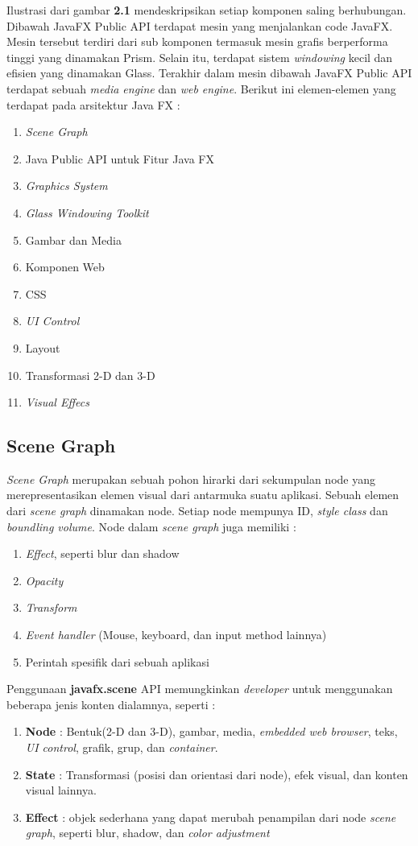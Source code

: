 Ilustrasi dari gambar \textbf{2.1} mendeskripsikan setiap komponen saling berhubungan. Dibawah JavaFX Public API terdapat mesin yang menjalankan code JavaFX. Mesin tersebut terdiri dari sub komponen termasuk mesin grafis berperforma tinggi yang dinamakan Prism. Selain itu, terdapat sistem \textit{windowing} kecil dan efisien yang dinamakan Glass. Terakhir dalam mesin dibawah JavaFX Public API terdapat sebuah \textit{media engine} dan \textit{web engine}. Berikut ini elemen-elemen yang terdapat pada arsitektur Java FX : \cite{javafx}
\begin{enumerate}
	\item \textit{Scene Graph}
	\item Java Public API untuk Fitur Java FX
	\item \textit{Graphics System}
	\item \textit{Glass Windowing Toolkit}
	\item Gambar dan Media
	\item Komponen Web
	\item CSS
	\item \textit{UI Control}
	\item Layout
	\item Transformasi 2-D dan 3-D
	\item \textit{Visual Effecs}
\end{enumerate}

\subsection{Scene Graph}
\textit{Scene Graph} merupakan sebuah pohon hirarki dari sekumpulan node yang merepresentasikan elemen visual dari antarmuka suatu aplikasi. Sebuah elemen dari \textit{scene graph} dinamakan node. Setiap node mempunya ID, \textit{style class} dan \textit{boundling volume}. Node dalam \textit{scene graph} juga memiliki :\cite{javafx}
\begin{enumerate}
	\item \textit{Effect}, seperti blur dan shadow
	\item \textit{Opacity}
	\item \textit{Transform}
	\item \textit{Event handler} (Mouse, keyboard, dan input method lainnya)
	\item Perintah spesifik dari sebuah aplikasi
\end{enumerate} 

Penggunaan \textbf{javafx.scene} API memungkinkan \textit{developer} untuk menggunakan beberapa jenis konten dialamnya, seperti : \cite{javafx}
\begin{enumerate}
	\item \textbf{Node} : Bentuk(2-D dan 3-D), gambar, media, \textit{embedded web browser}, teks, \textit{UI control}, grafik, grup, dan \textit{container}.
	\item \textbf{State} : Transformasi (posisi dan orientasi dari node), efek visual, dan konten visual lainnya.
	\item \textbf{Effect} : objek sederhana yang dapat merubah penampilan dari node \textit{scene graph}, seperti blur, shadow, dan \textit{color adjustment}
\end{enumerate}

